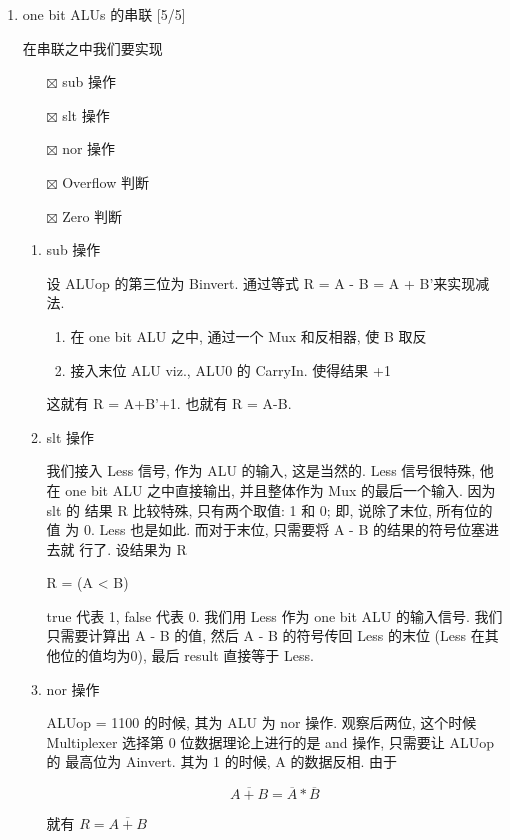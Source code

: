 \documentclass[11pt]{ctexart}
\begin{document}
\begin{enumerate}
\begin{enumerate}
\item one bit ALUs 的串联 [5/5]
\label{sec:orgb45f552}

在串联之中我们要实现
\begin{itemize}
\item[{$\boxtimes$}] sub 操作
\item[{$\boxtimes$}] slt 操作
\item[{$\boxtimes$}] nor 操作
\item[{$\boxtimes$}] Overflow 判断
\item[{$\boxtimes$}] Zero 判断
\end{itemize}

\begin{enumerate}
\item sub 操作
\label{sec:org2f7535b}

设 ALUop 的第三位为 Binvert. 通过等式 R = A - B = A + B'来实现减法.

\begin{enumerate}
\item 在 one bit ALU 之中, 通过一个 Mux 和反相器, 使 B 取反
\item 接入末位 ALU viz., ALU0 的 CarryIn. 使得结果 +1
\end{enumerate}

这就有 R = A+B'+1. 也就有 R = A-B. 

\item slt 操作
\label{sec:orgcc635ce}

我们接入 Less 信号, 作为 ALU 的输入, 这是当然的. Less 信号很特殊, 他在
one bit ALU 之中直接输出, 并且整体作为 Mux 的最后一个输入. 因为 slt 的
结果 R 比较特殊, 只有两个取值: 1 和 0; 即, 说除了末位, 所有位的值
为 0. Less 也是如此. 而对于末位, 只需要将 A - B 的结果的符号位塞进去就
行了. 设结果为 R 

R = (A < B) 

true 代表 1, false 代表 0. 我们用 Less 作为 one bit ALU 的输入信号. 
我们只需要计算出 A - B 的值, 然后 A - B 的符号传回 Less 的末位 (Less
在其他位的值均为0), 最后 result 直接等于 Less.  

\item nor 操作
\label{sec:org792d547}

ALUop = 1100 的时候, 其为 ALU 为 nor 操作. 观察后两位, 这个时候
Multiplexer 选择第 0 位数据理论上进行的是 and 操作, 只需要让 ALUop 的
最高位为 Ainvert. 其为 1 的时候, A 的数据反相. 由于

$$
\overline {A + B} = \overline A * \overline B
$$

就有 \(R = \overline{A + B}\)


\end{enumerate}
\end{enumerate}
\end{enumerate}
\end{document}
